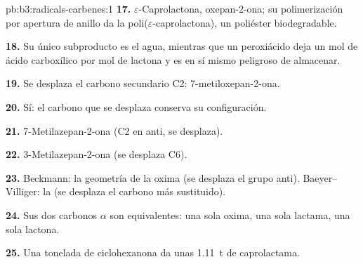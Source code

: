 \begin{solution}{pb:b3:radicals-carbenes:1}
\textbf{17.} $\varepsilon$-Caprolactona, oxepan-2-ona; su polimerización por apertura de anillo da la
poli($\varepsilon$-caprolactona), un poliéster biodegradable.

\textbf{18.} Su único subproducto es el agua, mientras que un peroxiácido deja un mol de
ácido carboxílico por mol de lactona y es en sí mismo peligroso de almacenar.

\textbf{19.} Se desplaza el carbono secundario C2: 7-metiloxepan-2-ona.

\textbf{20.} Sí: el carbono que se desplaza conserva su configuración.

\textbf{21.} 7-Metilazepan-2-ona (C2 en anti, se desplaza).

\textbf{22.} 3-Metilazepan-2-ona (se desplaza C6).

\textbf{23.} Beckmann: la geometría de la oxima (se desplaza el grupo anti).
Baeyer--Villiger: la  (se desplaza el carbono más sustituido).

\textbf{24.} Sus dos carbonos $\alpha$ son equivalentes: una sola oxima, una sola lactama, una sola lactona.

\textbf{25.} Una tonelada de ciclohexanona da unas \qty{1.11}{t} de caprolactama.
\end{solution}
